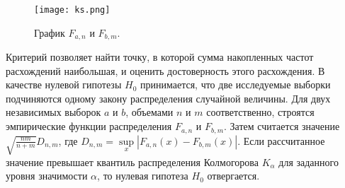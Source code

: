 \begin{figure}
    \centering
    \texttt{[image: ks.png]}
    \caption{График $F_{a, n}$ и $F_{b, m}$.}
    \label{ks}
\end{figure}

Критерий позволяет найти точку, в которой сумма накопленных частот расхождений наибольшая, и оценить достоверность этого расхождения. В качестве нулевой гипотезы $H_0$ принимается, что две исследуемые выборки подчиняются одному закону распределения случайной величины. Для двух независимых выборок $a$ и $b$, объемами $n$ и $m$ соответственно, строятся эмпирические функции распределения $F_{a, n}$ и $F_{b, m}$. Затем считается значение $\sqrt{\frac{nm}{n + m}}D_{n, m}$, где $D_{n, m} = \sup\limits_x|F_{a, n}(x) - F_{b, m}(x)|$. Если рассчитанное значение превышает квантиль распределения Колмогорова $K_{\alpha}$ для заданного уровня значимости $\alpha$, то нулевая гипотеза $H_0$ отвергается.



